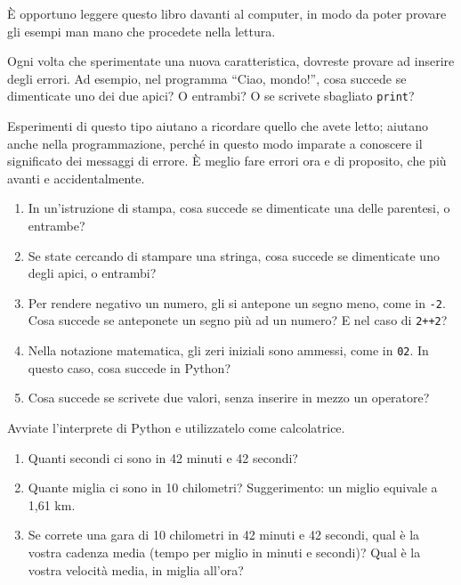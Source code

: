 \documentclass[10pt]{book}
\begin{document}
\begin{exercise}

È opportuno leggere questo libro davanti al computer, in modo da poter provare gli esempi man mano che procedete nella lettura.

Ogni volta che sperimentate una nuova caratteristica, dovreste provare ad inserire degli errori. Ad esempio, nel programma ``Ciao, mondo!'', cosa succede se dimenticate uno dei due apici? O entrambi? O se scrivete sbagliato {\tt print}?

Esperimenti di questo tipo aiutano a ricordare quello che avete letto; aiutano anche nella programmazione, perché in questo modo imparate a conoscere il significato dei messaggi di errore. È meglio fare errori ora e di proposito, che più avanti e accidentalmente.

\begin{enumerate}

\item In un'istruzione di stampa, cosa succede se dimenticate una delle parentesi, o entrambe?

\item Se state cercando di stampare una stringa, cosa succede se dimenticate uno degli apici, o entrambi?

\item Per rendere negativo un numero, gli si antepone un segno meno, come in 
{\tt -2}.  Cosa succede se anteponete un segno più ad un numero?
E nel caso di {\tt 2++2}?

\item Nella notazione matematica, gli zeri iniziali sono ammessi, come in {\tt 02}. In questo caso, cosa succede in Python?

\item Cosa succede se scrivete due valori, senza inserire in mezzo un operatore?

\end{enumerate}

\end{exercise}

\vspace{0.2in}
\begin{exercise}

Avviate l'interprete di Python e utilizzatelo come calcolatrice. 

\begin{enumerate}

\item Quanti secondi ci sono in 42 minuti e 42 secondi?

\item Quante miglia ci sono in 10 chilometri?  Suggerimento: un miglio equivale a 1,61 km.

\item Se correte una gara di 10 chilometri in 42 minuti e 42 secondi, qual è la vostra cadenza media (tempo per miglio in minuti e secondi)? Qual è la vostra velocità media, in miglia all'ora?


\end{enumerate}

\end{exercise}
\end{document}
